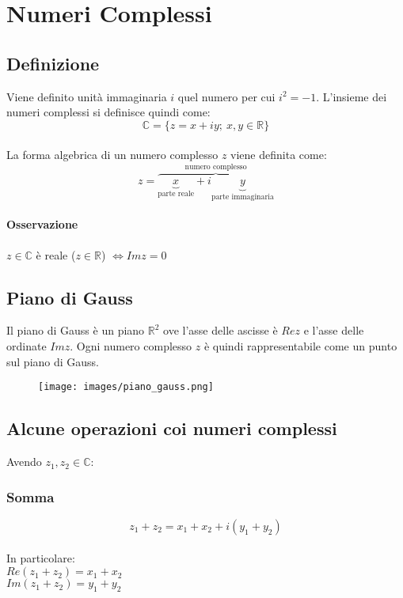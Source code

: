\chapter{Numeri Complessi}
\section{Definizione}
Viene definito unità immaginaria $i$ quel numero per cui $i^2 = -1$.
L'insieme dei numeri complessi si definisce quindi come:\\
\begin{equation}
\mathbb{C} = \{z = x + iy;\ x,y \in \mathbb{R}\}
\end{equation}\\
La forma algebrica di un numero complesso $z$ viene definita come:
\[
z = \overbrace{
	\underbrace{x}_\text{parte reale} + i
	\underbrace{y}_\text{parte immaginaria}
}^\text{numero complesso}
\]
\subsubsection{Osservazione}
$z \in \mathbb{C}$ è reale ($z \in \mathbb{R}$) $\iff Imz = 0$

\section{Piano di Gauss}
Il piano di Gauss è un piano $\mathbb{R}^2$ ove l'asse delle ascisse è $Rez$ e l'asse delle ordinate $Imz$. Ogni numero complesso $z$ è quindi rappresentabile come un punto sul piano di Gauss.\\
\begin{figure}[htbp]
	\centering
	\texttt{[image: images/piano\_gauss.png]}
\end{figure}

\section{Alcune operazioni coi numeri complessi}
Avendo $z_1,z_2 \in \mathbb{C}$:

\subsection{Somma}
\begin{equation}
z_1+z_2 = x_1+x_2+i(y_1+y_2)
\end{equation}\\
In particolare:\\
$Re(z_1+z_2) = x_1+x_2$\\
$Im(z_1+z_2) = y_1+y_2$
